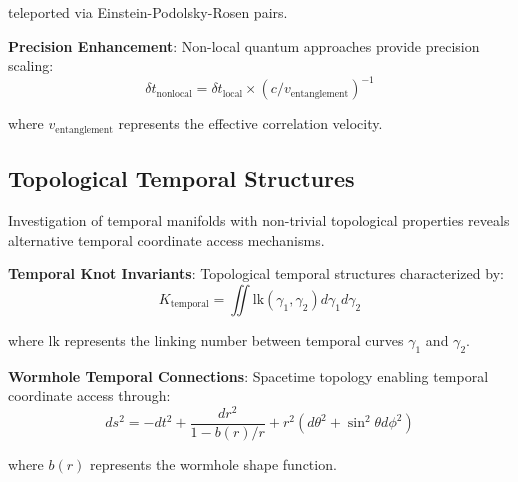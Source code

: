 \documentclass[12pt,a4paper]{article}
\begin{document}
teleported via Einstein-Podolsky-Rosen pairs.

\textbf{Precision Enhancement}: Non-local quantum approaches provide precision scaling:
$$\delta t_{\text{nonlocal}} = \delta t_{\text{local}} \times (c/v_{\text{entanglement}})^{-1}$$

where $v_{\text{entanglement}}$ represents the effective correlation velocity.

\subsection{Topological Temporal Structures}

Investigation of temporal manifolds with non-trivial topological properties reveals alternative temporal coordinate access mechanisms.

\textbf{Temporal Knot Invariants}: Topological temporal structures characterized by:
$$K_{\text{temporal}} = \iint \text{lk}(\gamma_1,\gamma_2) d\gamma_1 d\gamma_2$$

where $\text{lk}$ represents the linking number between temporal curves $\gamma_1$ and $\gamma_2$.

\textbf{Wormhole Temporal Connections}: Spacetime topology enabling temporal coordinate access through:
$$ds^2 = -dt^2 + \frac{dr^2}{1-b(r)/r} + r^2(d\theta^2 + \sin^2\theta d\phi^2)$$

where $b(r)$ represents the wormhole shape function.
\end{document}
